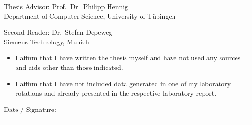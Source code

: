 \documentclass[11pt, A4, twoside, openright]{report}
\begin{document}
\begin{titlepage}
    \vspace*{8cm}

    Thesis Advisor: \hspace{0.9cm} Prof.\ Dr.\ Philipp Hennig\vspace{0.1cm}\\ 
                    \hspace*{4.34cm}  Department of Computer Science, University of Tübingen\\

    \vspace{1cm}

    Second Reader:  \hspace{0.93cm} Dr.\ Stefan Depeweg\vspace{0.1cm}\\ 
                    \hspace*{4.34cm} Siemens Technology, Munich

    \vspace{2cm}

    \begin{itemize}
    \item I affirm that I have written the thesis myself and have not used any sources and aids other than those indicated.
    \item I affirm that I have not included data generated in one of my laboratory rotations and already presented in the respective laboratory report.
    \end{itemize}

    \vspace{2cm}

    Date / Signature: \hspace{1cm} \rule{8cm}{0.25pt}
\end{titlepage}


\begin{abstract}

\end{abstract}

\cleardoublepage
\end{document}
